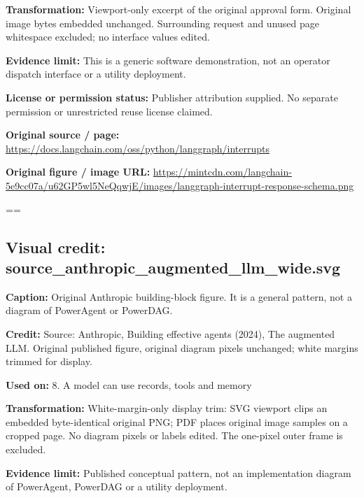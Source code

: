 \documentclass[10pt,letterpaper]{article}
\begin{document}
\textbf{Transformation:} Viewport-only excerpt of the original approval form. Original image bytes embedded unchanged. Surrounding request and unused page whitespace excluded; no interface values edited.\par
\textbf{Evidence limit:} This is a generic software demonstration, not an operator dispatch interface or a utility deployment.\par
\textbf{License or permission status:} Publisher attribution supplied. No separate permission or unrestricted reuse license claimed.\par
\textbf{Original source / page:} \href{https://docs.langchain.com/oss/python/langgraph/interrupts}{\small\ttfamily https:/\allowbreak{}/\allowbreak{}docs.\allowbreak{}langchain.\allowbreak{}com/\allowbreak{}oss/\allowbreak{}python/\allowbreak{}langgraph/\allowbreak{}interrupts}\par
\textbf{Original figure / image URL:} \href{https://mintcdn.com/langchain-5e9cc07a/u62GP5wl5NeQqwjE/images/langgraph-interrupt-response-schema.png}{\small\ttfamily https:/\allowbreak{}/\allowbreak{}mintcdn.\allowbreak{}com/\allowbreak{}langchain-\allowbreak{}5e9cc07a/\allowbreak{}u62GP5wl5NeQqwjE/\allowbreak{}images/\allowbreak{}langgraph-\allowbreak{}interrupt-\allowbreak{}response-\allowbreak{}schema.\allowbreak{}png}\par
\egroup\par\noindent\box\readingEntry\par\medskip
\setbox\readingEntry=\vbox\bgroup\hsize=\linewidth\subsection*{Visual credit: source\_anthropic\_augmented\_llm\_wide.svg}
\textbf{Caption:} Original Anthropic building-block figure. It is a general pattern, not a diagram of PowerAgent or PowerDAG.\par
\textbf{Credit:} Source: Anthropic, Building effective agents (2024), The augmented LLM. Original published figure, original diagram pixels unchanged; white margins trimmed for display.\par
\textbf{Used on:} 8. A model can use records, tools and memory\par
\textbf{Transformation:} White-margin-only display trim: SVG viewport clips an embedded byte-identical original PNG; PDF places original image samples on a cropped page. No diagram pixels or labels edited. The one-pixel outer frame is excluded.\par
\textbf{Evidence limit:} Published conceptual pattern, not an implementation diagram of PowerAgent, PowerDAG or a utility deployment.\par
\end{document}
